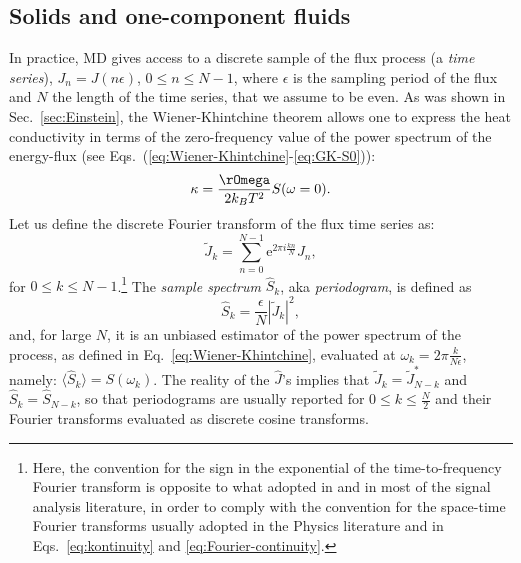 \subsection{Solids and one-component fluids} \label{sec:univariate}
In practice, MD gives access to a discrete sample of the flux process (a \emph{time series}), $J_n = J(n \epsilon)$, $0 \leq n \leq N-1$, where $\epsilon$ is the sampling period of the flux and $N$ the length of the time series, that we assume to be even. As was shown in Sec.~\ref{sec:Einstein}, the Wiener-Khintchine theorem allows one to express the heat conductivity in terms of the zero-frequency value of the power spectrum of the energy-flux (see Eqs.~(\ref{eq:Wiener-Khintchine}-\ref{eq:GK-S0})):
\begin{equation}
\kappa = \frac{\rOmega}{2k_B T^2} S (\omega=0). \label{eq:kappa-S0}
\end{equation}
Let us define the discrete Fourier transform of the flux time series as:
\begin{equation}
  \tilde{J}_{k}=\sum_{n=0}^{N-1} \mathrm{e}^{ 2\pi i\frac{kn}{N}} J_n, \label{eq:Jk}
\end{equation}
for $0 \leq k \leq N-1$.\footnote{Here, the convention for the sign in the exponential of the time-to-frequency Fourier transform is opposite to what adopted in \citep{Ercole2017} and in most of the signal analysis literature, in order to comply with the convention for the space-time Fourier transforms usually adopted in the Physics literature and in Eqs.~\eqref{eq:kontinuity} and \eqref{eq:Fourier-continuity}.} The \emph{sample spectrum} $\hat S_k$, aka \emph{periodogram}, is defined as
\begin{equation}
\hat{S}_{k}=\frac{\epsilon}{N} \left |\tilde{J}_{k} \right |^2, \label{eq:periodogram-def}
\end{equation}
and, for large $N$, it is an unbiased estimator of the power spectrum of the process, as defined in Eq.~\eqref{eq:Wiener-Khintchine}, evaluated at $\omega_k=2\pi\frac{k}{N\epsilon}$, namely: $\langle \hat S_k \rangle = S(\omega_k)$. The reality of the $\hat J$'s implies that $\tilde J_k=\tilde J^*_{N-k}$ and $\hat S_k=\hat S_{N-k}$, so that periodograms are usually reported for $0\leq k\leq \frac{N}{2}$ and their Fourier transforms evaluated as discrete cosine transforms.

